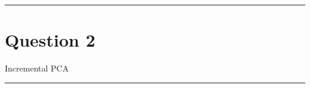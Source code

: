 \clearpage
\rule{\textwidth}{1mm}
\vspace{-2em}
\section{Question 2} Incremental PCA
\newline
\rule{\textwidth}{1mm}